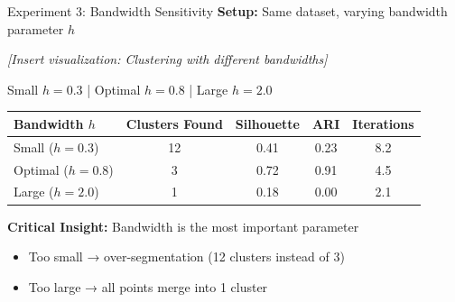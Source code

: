 \begin{frame}{Experiment 3: Bandwidth Sensitivity}
    \textbf{Setup:} Same dataset, varying bandwidth parameter $h$

    \vspace{0.3cm}

    \begin{center}
        \textit{[Insert visualization: Clustering with different bandwidths]}

        \vspace{0.2cm}

        \small{Small $h = 0.3$ | Optimal $h = 0.8$ | Large $h = 2.0$}
    \end{center}

    \vspace{0.3cm}

    \begin{table}
        \centering
        \begin{tabular}{lcccc}
            \toprule
            \textbf{Bandwidth $h$} & \textbf{Clusters Found} & \textbf{Silhouette} & \textbf{ARI} & \textbf{Iterations} \\
            \midrule
            Small ($h = 0.3$) & 12 & 0.41 & 0.23 & 8.2 \\
            \textcolor{customred}{Optimal ($h = 0.8$)} & \textcolor{customred}{3} & \textcolor{customred}{0.72} & \textcolor{customred}{0.91} & \textcolor{customred}{4.5} \\
            Large ($h = 2.0$) & 1 & 0.18 & 0.00 & 2.1 \\
            \bottomrule
        \end{tabular}
    \end{table}

    \vspace{0.2cm}

    \small{\textbf{Critical Insight:} Bandwidth is the most important parameter}
    \begin{itemize}
        \small
        \item Too small → over-segmentation (12 clusters instead of 3)
        \item Too large → all points merge into 1 cluster
    \end{itemize}
\end{frame}

